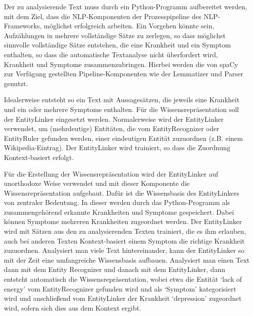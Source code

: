 Der zu analysierende Text muss durch ein Python-Programm aufbereitet werden, mit dem Ziel, dass die NLP-Komponenten der Prozesspipeline des NLP-Frameworks, möglichst erfolgreich arbeiten. Ein Vorgehen könnte sein, Aufzählungen in mehrere vollständige Sätze zu zerlegen, so dass möglichst sinnvolle vollständige Sätze entstehen, die eine Krankheit und ein Symptom enthalten, so dass die automatische Textanalyse nicht überfordert wird, Krankheit und Symptome zusammenzubringen. Hierbei werden die von spaCy zur Verfügung gestellten Pipeline-Komponenten wie der Lemmatizer und Parser genutzt.

Idealerweise entsteht so ein Text mit Aussagesätzen, die jeweils eine Krankheit und ein oder mehrere Symptome enthalten. Für die Wissensrepräsentation soll der EntityLinker eingesetzt werden. Normalerweise wird der EntityLinker verwendet, um (mehrdeutige) Entitäten, die vom EntityRecognizer oder EntityRuler gefunden werden, einer eindeutigen Entität zuzuordnen (z.B. einem Wikipedia-Eintrag). Der EntityLinker wird trainiert, so dass die Zuordnung Kontext-basiert erfolgt.

Für die Erstellung der Wissensrepräsentation wird der EntityLinker auf unorthodoxe Weise verwendet und mit dieser Komponente die Wissensrepräsentation aufgebaut. Dafür ist die Wissensbasis des EntityLinkers von zentraler Bedeutung. In dieser werden durch das Python-Programm als zusammengehörend erkannte Krankheiten und Symptome gespeichert. Dabei können Symptome mehreren Krankheiten zugeordnet werden. Der EntityLinker wird mit Sätzen aus den zu analysierenden Texten trainiert, die es ihm erlauben, auch bei anderen Texten Kontext-basiert einem Symptom die richtige Krankheit zuzuordnen. Analysiert man viele Text hintereinander, kann der EntityLinker so mit der Zeit eine umfangreiche Wissensbasis aufbauen. Analysiert man einen Text dann mit dem Entity Recognizer und danach mit dem EntityLinker, dann entsteht automatisch die Wissensrepräsentation, wobei etwa die Entität `lack of energy' vom EntityRecognizer gefunden wird und als `Symptom' kategorisiert wird und anschließend vom EntityLinker der Krankheit `depression' zugeordnet wird, sofern sich dies aus dem Kontext ergibt.

\vspace{1cm}

